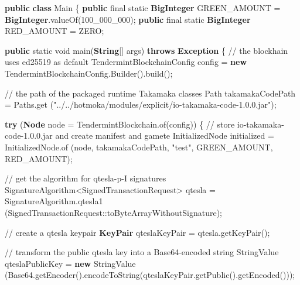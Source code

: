 \documentclass[a4paper,]{book}
\newenvironment{Shaded}{\begin{snugshade}}{\end{snugshade}}
\newcommand{\BuiltInTok}[1]{\textcolor[rgb]{0.39,0.29,0.61}{\textbf{#1}}}
\newcommand{\CommentTok}[1]{\textcolor[rgb]{0.54,0.53,0.53}{#1}}
\newcommand{\DataTypeTok}[1]{\textcolor[rgb]{0.00,0.34,0.68}{#1}}
\newcommand{\DecValTok}[1]{\textcolor[rgb]{0.69,0.50,0.00}{#1}}
\newcommand{\FunctionTok}[1]{\textcolor[rgb]{0.39,0.29,0.61}{#1}}
\newcommand{\KeywordTok}[1]{\textcolor[rgb]{0.12,0.11,0.11}{\textbf{#1}}}
\newcommand{\NormalTok}[1]{\textcolor[rgb]{0.12,0.11,0.11}{#1}}
\newcommand{\StringTok}[1]{\textcolor[rgb]{0.75,0.01,0.01}{#1}}
\renewenvironment{Shaded}{\begin{snugshade}\small}{\end{snugshade}}
\begin{document}
{\begin{Shaded}
\begin{Highlighting}[]
\KeywordTok{public} \KeywordTok{class}\NormalTok{ Main \{}
  \KeywordTok{public} \DataTypeTok{final} \DataTypeTok{static} \BuiltInTok{BigInteger}\NormalTok{ GREEN_AMOUNT = }\BuiltInTok{BigInteger}\NormalTok{.}\FunctionTok{valueOf}\NormalTok{(}\DecValTok{100_000_000}\NormalTok{);}
  \KeywordTok{public} \DataTypeTok{final} \DataTypeTok{static} \BuiltInTok{BigInteger}\NormalTok{ RED_AMOUNT = ZERO;}

  \KeywordTok{public} \DataTypeTok{static} \DataTypeTok{void} \FunctionTok{main}\NormalTok{(}\BuiltInTok{String}\NormalTok{[] args) }\KeywordTok{throws} \BuiltInTok{Exception}\NormalTok{ \{}
    \CommentTok{// the blockhain uses ed25519 as default}
\NormalTok{    TendermintBlockchainConfig config = }\KeywordTok{new}\NormalTok{ TendermintBlockchainConfig.}\FunctionTok{Builder}\NormalTok{().}\FunctionTok{build}\NormalTok{();}

    \CommentTok{// the path of the packaged runtime Takamaka classes}
\NormalTok{    Path takamakaCodePath = Paths.}\FunctionTok{get}
\NormalTok{      (}\StringTok{"../../hotmoka/modules/explicit/io-takamaka-code-1.0.0.jar"}\NormalTok{);}

    \KeywordTok{try}\NormalTok{ (}\BuiltInTok{Node}\NormalTok{ node = TendermintBlockchain.}\FunctionTok{of}\NormalTok{(config)) \{}
      \CommentTok{// store io-takamaka-code-1.0.0.jar and create manifest and gamete}
\NormalTok{      InitializedNode initialized = InitializedNode.}\FunctionTok{of}
\NormalTok{        (node, takamakaCodePath, }\StringTok{"test"}\NormalTok{, GREEN_AMOUNT, RED_AMOUNT);}

      \CommentTok{// get the algorithm for qtesla-p-I signatures}
\NormalTok{      SignatureAlgorithm<SignedTransactionRequest> qtesla = SignatureAlgorithm.}\FunctionTok{qtesla1}
\NormalTok{        (SignedTransactionRequest::toByteArrayWithoutSignature);}

      \CommentTok{// create a qtesla keypair}
      \BuiltInTok{KeyPair}\NormalTok{ qteslaKeyPair = qtesla.}\FunctionTok{getKeyPair}\NormalTok{();}

      \CommentTok{// transform the public qtesla key into a Base64-encoded string}
\NormalTok{      StringValue qteslaPublicKey = }\KeywordTok{new}\NormalTok{ StringValue}
\NormalTok{        (Base64.}\FunctionTok{getEncoder}\NormalTok{().}\FunctionTok{encodeToString}\NormalTok{(qteslaKeyPair.}\FunctionTok{getPublic}\NormalTok{().}\FunctionTok{getEncoded}\NormalTok{()));}


\end{Highlighting}
\end{Shaded}}
\end{document}
